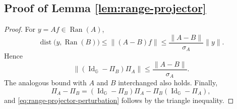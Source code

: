 \documentclass{article}
\theoremstyle{definition}
\theoremstyle{remark}
\theoremstyle{plain}
\numberwithin{equation}{section}
\begin{document}
\subsection{Proof of Lemma \ref{lem:range-projector}}
\label{app:proof-range-projector}
\begin{proof}
For \(y=Af\in\operatorname{Ran}(A)\),
\[
    \operatorname{dist}
    \bigl(y,\operatorname{Ran}(B)\bigr)
    \leq
    \|(A-B)f\|
    \leq
    \frac{\|A-B\|}{\sigma_A}\|y\|.
\]
Hence
\[
    \|(\operatorname{Id}_{\mathbb G}-\Pi_B)\Pi_A\|
    \leq
    \frac{\|A-B\|}{\sigma_A}.
\]
The analogous bound with \(A\) and \(B\) interchanged also holds. Finally,
\[
    \Pi_A-\Pi_B
    =
    (\operatorname{Id}_{\mathbb G}-\Pi_B)\Pi_A
    -
    \Pi_B(\operatorname{Id}_{\mathbb G}-\Pi_A),
\]
and \eqref{eq:range-projector-perturbation} follows by the triangle inequality.
\end{proof}
\end{document}
